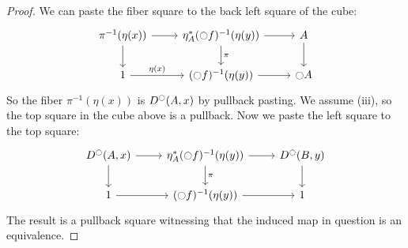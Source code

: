 \documentclass[9pt,twosided]{amsart}
\begin{document}
\begin{proof}
We can paste the fiber square to the back left square of the cube:
\begin{equation*}
  \begin{tikzcd}
      \pi^{-1}(\eta(x))\arrow[r]\arrow[d] & \eta_A^\ast(\modal f)^{-1}(\eta(y))\arrow[r]\arrow[d, "\pi"] & A\arrow[d] \\
      1\arrow[r,"\eta(x)"]                                & (\modal f)^{-1}(\eta(y))\arrow[r] & \modal A
  \end{tikzcd}
\end{equation*}
So the fiber $\pi^{-1}(\eta(x))$ is $D^{\ocircle}(A,x)$ by pullback pasting.
We assume (iii), so the top square in the cube above is a pullback.
Now we paste the left square to the top square:
\begin{equation*}
  \begin{tikzcd}
      D^\modal(A,x)\arrow[d]\arrow[r] & \eta_A^\ast(\modal f)^{-1}(\eta(y))\arrow[r]\arrow[d, "\pi"] & D^\modal(B,y)\arrow[d] \\
      1\arrow[r]                                & (\modal f)^{-1}(\eta(y))\arrow[r] & 1 
  \end{tikzcd}
\end{equation*}
The result is a pullback square witnessing that the induced map in question is an equivalence.

\end{proof}

\begin{comment}%
\begin{cor}
If $f:A\to B$ is $\modal$-\'etale, then the square
\begin{equation*}
\begin{tikzcd}[column sep=large]
A \arrow[d,swap,"\delta_{\modalunit}"] \arrow[r,"f"] & B \arrow[d,"\delta_{\modalunit}"] \\
A\times_{\modal A} A \arrow[r,swap,"f\times_{\modal f}f"] & B\times_{\modal B} B
\end{tikzcd}
\end{equation*}
is a pullback square.
\end{cor}

\begin{proof}
Consider the diagram
\begin{equation*}
\begin{tikzcd}[column sep=large]
A \arrow[d,swap,"\delta_{\modalunit}"] \arrow[r,"f"] & B \arrow[d,"\delta_{\modalunit}"] \\
A\times_{\modal A} A \arrow[d,swap,"\pi_1"] \arrow[r,"{f\times_{\modal f} f}"] & B\times_{\modal B} B \arrow[d,"\pi_1"] \\
A \arrow[r,"f"] & B
\end{tikzcd}
\end{equation*}
The bottom square is a pullback square by \cref{lem:etale_char}, and the outer rectangle is a pullback since both vertical composites are homotopic to the respective identity functions. Therefore the top square is a pullback.
\end{proof}
\end{comment}
\end{document}
